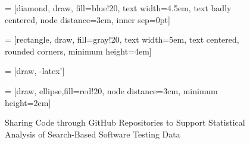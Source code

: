 
\begin{figure*}

  \begin{center}


   = [diamond, draw, fill=blue!20, text width=4.5em, text badly centered, node distance=3cm, inner sep=0pt]

   = [rectangle, draw, fill=gray!20, text width=5em, text centered, rounded corners, minimum height=4em]

   = [draw, -latex']

   = [draw, ellipse,fill=red!20, node distance=3cm, minimum height=2em]


  \end{center}

  \caption{Sharing Code through GitHub Repositories to Support Statistical Analysis of Search-Based Software Testing Data}

\end{figure*}
